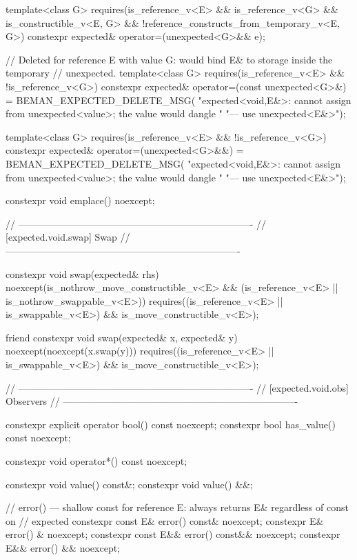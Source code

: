 \begin{codeblock}
{  template<class G>
    requires(is_reference_v<E> && is_reference_v<G> && is_constructible_v<E, G> &&
             !reference_constructs_from_temporary_v<E, G>)
  constexpr expected& operator=(unexpected<G>&& e);

  // Deleted for reference E with value G: would bind E& to storage inside the temporary
  // unexpected.
  template<class G>
    requires(is_reference_v<E> && !is_reference_v<G>)
  constexpr expected& operator=(const unexpected<G>&) = BEMAN_EXPECTED_DELETE_MSG(
      "expected<void,E&>: cannot assign from unexpected<value>; the value would dangle "
      "— use unexpected<E&>");

  template<class G>
    requires(is_reference_v<E> && !is_reference_v<G>)
  constexpr expected& operator=(unexpected<G>&&) = BEMAN_EXPECTED_DELETE_MSG(
      "expected<void,E&>: cannot assign from unexpected<value>; the value would dangle "
      "— use unexpected<E&>");

  constexpr void emplace() noexcept;

  // -------------------------------------------------------------------------
  // [expected.void.swap] Swap
  // -------------------------------------------------------------------------

  constexpr void swap(expected& rhs) noexcept(is_nothrow_move_constructible_v<E> &&
                                              (is_reference_v<E> ||
                                               is_nothrow_swappable_v<E>))
    requires((is_reference_v<E> || is_swappable_v<E>) && is_move_constructible_v<E>);

  friend constexpr void swap(expected& x, expected& y) noexcept(noexcept(x.swap(y)))
    requires((is_reference_v<E> || is_swappable_v<E>) && is_move_constructible_v<E>);

  // -------------------------------------------------------------------------
  // [expected.void.obs] Observers
  // -------------------------------------------------------------------------

  constexpr explicit operator bool() const noexcept;
  constexpr bool has_value() const noexcept;

  constexpr void operator*() const noexcept;

  constexpr void value() const&;
  constexpr void value() &&;

  // error() — shallow const for reference E: always returns E& regardless of const on
  // expected
  constexpr const E& error() const& noexcept;
  constexpr E& error() & noexcept;
  constexpr const E&& error() const&& noexcept;
  constexpr E&& error() && noexcept;

}
\end{codeblock}
